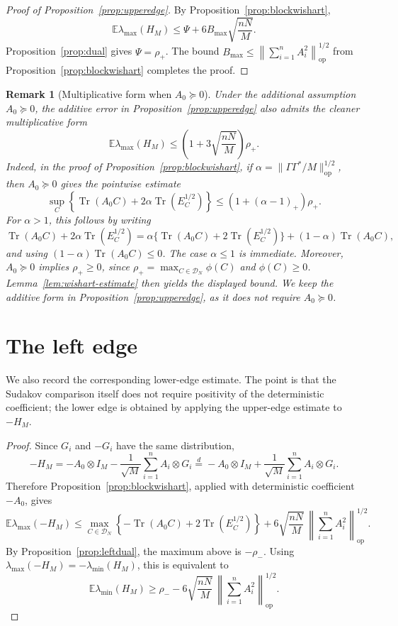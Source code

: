 \documentclass{article}
\newtheorem{remark}[theorem]{Remark}
\newcommand{\E}{\mathbb E}
\newcommand{\DN}{\mathcal D_N}
\newcommand{\op}{\mathrm{op}}
\newcommand{\Arow}{\left\|\sum_{i=1}^n A_i^2\right\|_{\op}^{1/2}}
\DeclareMathOperator{\Tr}{Tr}
\begin{document}
\upperedgeprop

\begin{proof}[Proof of Proposition~\ref{prop:upperedge}]
	By Proposition~\ref{prop:blockwishart},
	\[
		\E\lambda_{\max}(H_M)
		\le
		\Psi+6B_{\max}\sqrt{\frac{nN}{M}}.
	\]
	Proposition~\ref{prop:dual} gives $\Psi=\rho_+$.  The bound
	$B_{\max}\le\Arow$ from Proposition~\ref{prop:blockwishart} completes the
	proof.
\end{proof}

\begin{remark}[Multiplicative form when $A_0\succeq0$]
	Under the additional assumption $A_0\succeq0$, the additive error in
	Proposition~\ref{prop:upperedge} also admits the cleaner multiplicative form
	\[
		\E\lambda_{\max}(H_M)
		\le
		\left(1+3\sqrt{\frac{nN}{M}}\right)\rho_+.
	\]
	Indeed, in the proof of Proposition~\ref{prop:blockwishart}, if
	$\alpha=\|\Gamma\Gamma^*/M\|_{\op}^{1/2}$, then $A_0\succeq0$ gives the
	pointwise estimate
	\[
		\sup_C
		\left\{
		\Tr(A_0C)+2\alpha\Tr(E_C^{1/2})
		\right\}
		\le
		(1+(\alpha-1)_+)\rho_+.
	\]
	For \(\alpha>1\), this follows by writing
	\[
		\Tr(A_0C)+2\alpha\Tr(E_C^{1/2})
		=
		\alpha\{\Tr(A_0C)+2\Tr(E_C^{1/2})\}
		+(1-\alpha)\Tr(A_0C),
	\]
	and using \((1-\alpha)\Tr(A_0C)\le0\).  The case \(\alpha\le1\) is immediate.
	Moreover, \(A_0\succeq0\) implies \(\rho_+\ge0\), since
	\(\rho_+=\max_{C\in\DN}\phi(C)\) and \(\phi(C)\ge0\).
	Lemma~\ref{lem:wishart-estimate} then yields the displayed bound.  We keep the
	additive form in Proposition~\ref{prop:upperedge}, as it does not require
	$A_0\succeq0$.
\end{remark}

\section{The left edge}
\label{sec:left-edge}

We also record the corresponding lower-edge estimate.  The point is that the
Sudakov comparison itself does not require positivity of the deterministic
coefficient; the lower edge is obtained by applying the upper-edge estimate to
$-H_M$.

\leftedgeprop

\begin{proof}
	Since $G_i$ and $-G_i$ have the same
	distribution,
	\[
		-H_M
		=
		-A_0\otimes I_M-\frac1{\sqrt M}\sum_{i=1}^n A_i\otimes G_i
		\stackrel{d}{=}
		-A_0\otimes I_M+\frac1{\sqrt M}\sum_{i=1}^n A_i\otimes G_i .
	\]
	Therefore Proposition~\ref{prop:blockwishart}, applied with deterministic
	coefficient $-A_0$, gives
	\[
		\E\lambda_{\max}(-H_M)
		\le
		\max_{C\in\DN}
		\left\{
		-\Tr(A_0C)+2\Tr(E_C^{1/2})
		\right\}
		+
		6\sqrt{\frac{nN}{M}}\,\Arow.
	\]
	By Proposition~\ref{prop:leftdual}, the maximum above is \(-\rho_-\).  Using
	$\lambda_{\max}(-H_M)=-\lambda_{\min}(H_M)$, this is equivalent to
	\[
		\E\lambda_{\min}(H_M)
		\ge
		\rho_-
		-
		6\sqrt{\frac{nN}{M}}\,\Arow.
	\]
\end{proof}
\end{document}
